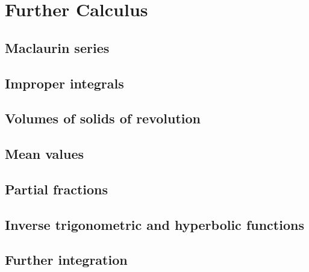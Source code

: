 \chapter{Further Calculus}

\section{Maclaurin series}
\section{Improper integrals}
\section{Volumes of solids of revolution}
\section{Mean values}
\section{Partial fractions}
\section{Inverse trigonometric and hyperbolic functions}
\section{Further integration}